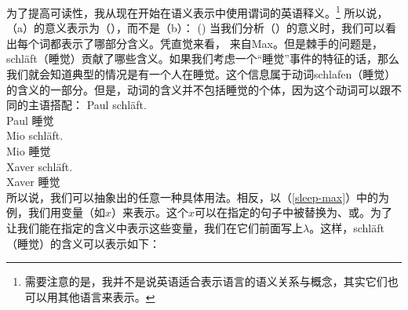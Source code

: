 \noindent
为了提高可读性，我从现在开始在语义表示中使用谓词的英语释义。\footnote{%
需要注意的是，我并不是说英语适合表示语言的语义关系与概念，其实它们也可以用其他语言来表示。
}
所以说，（a）的意义表示为（），而不是（b）：
\ea
\label{sleep-max}
()
\z
当我们分析（）的意义时，我们可以看出每个词都表示了哪部分含义。凭直觉来看， 来自Max。但是棘手的问题是，schläft（睡觉）贡献了哪些含义。如果我们考虑一个“睡觉”事件的特征的话，那么我们就会知道典型的情况是有一个人在睡觉。这个信息属于动词schlafen（睡觉）的含义的一部分。但是，动词的含义并不包括睡觉的个体，因为这个动词可以跟不同的主语搭配：
 \eal
\ex 
\gll Paul schläft.\\
     Paul 睡觉\\
\ex 
\gll Mio schläft.\\
     Mio 睡觉\\
\ex 
\gll Xaver schläft.\\
     Xaver 睡觉\\
\zl
所以说，我们可以抽象出的任意一种具体用法。相反，以（\ref{sleep-max}）中的为例，我们用变量（如$x$）来表示。这个$x$可以在指定的句子中被替换为、或。为了让我们能在指定的含义中表示这些变量，我们在它们前面写上$\lambda$。这样，schläft（睡觉）的含义可以表示如下：
